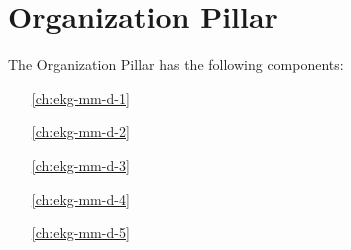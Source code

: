 \part{Organization Pillar}\label{pt:ekgmm-d} %

The Organization Pillar has the following components:

\begin{itemize}[leftmargin=.5in]
    \item [\ref{ch:ekg-mm-d-1}] 
    \item [\ref{ch:ekg-mm-d-2}] 
    \item [\ref{ch:ekg-mm-d-3}] 
    \item [\ref{ch:ekg-mm-d-4}] 
    \item [\ref{ch:ekg-mm-d-5}] 
\end{itemize}

%
%
%
%
%





